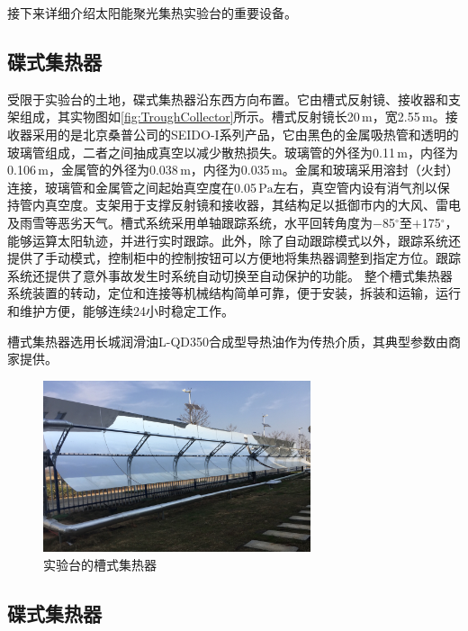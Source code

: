 接下来详细介绍太阳能聚光集热实验台的重要设备。

\subsection{碟式集热器}
受限于实验台的土地，碟式集热器沿东西方向布置。它由槽式反射镜、接收器和支架组成，其实物图如\autoref{fig:TroughCollector}所示。槽式反射镜长20$\,\mathrm{m}$，宽2.55$\,\mathrm{m}$。接收器采用的是北京桑普公司的SEIDO-I系列产品，它由黑色的金属吸热管和透明的玻璃管组成，二者之间抽成真空以减少散热损失。玻璃管的外径为0.11$\,\mathrm{m}$，内径为0.106$\,\mathrm{m}$，金属管的外径为0.038$\,\mathrm{m}$，内径为0.035$\,\mathrm{m}$。金属和玻璃采用溶封（火封）连接，玻璃管和金属管之间起始真空度在0.05$\,\mathrm{Pa}$左右，真空管内设有消气剂以保持管内真空度。支架用于支撑反射镜和接收器，其结构足以抵御市内的大风、雷电及雨雪等恶劣天气。槽式系统采用单轴跟踪系统，水平回转角度为$-$85$^\circ$至$+$175$^\circ$，能够运算太阳轨迹，并进行实时跟踪。此外，除了自动跟踪模式以外，跟踪系统还提供了手动模式，控制柜中的控制按钮可以方便地将集热器调整到指定方位。跟踪系统还提供了意外事故发生时系统自动切换至自动保护的功能。
整个槽式集热器系统装置的转动，定位和连接等机械结构简单可靠，便于安装，拆装和运输，运行和维护方便，能够连续24小时稳定工作。

槽式集热器选用长城润滑油L-QD350合成型导热油作为传热介质，其典型参数由商家提供。

\begin{figure}[!ht]
\centering
\includegraphics[width=0.7\textwidth]{fig/TroughCollector.jpg}
\caption{实验台的槽式集热器}
\label{fig:TroughCollector}
\end{figure}

\subsection{碟式集热器}

